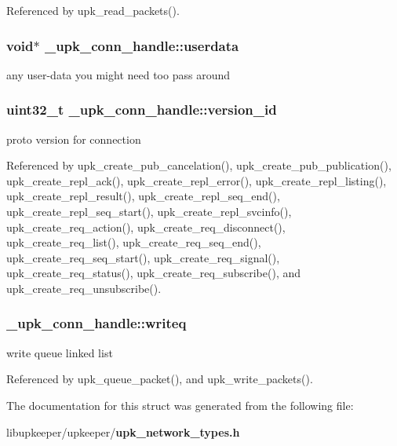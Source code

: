 Referenced by upk\_\-read\_\-packets().

\subsubsection[{userdata}]{\setlength{\rightskip}{0pt plus 5cm}void$\ast$ {\bf \_\-upk\_\-conn\_\-handle::userdata}}\label{struct__upk__conn__handle_ab2f299ba31ef81890e202d838916af22}
any user-\/data you might need too pass around 
\subsubsection[{version\_\-id}]{\setlength{\rightskip}{0pt plus 5cm}uint32\_\-t {\bf \_\-upk\_\-conn\_\-handle::version\_\-id}}\label{struct__upk__conn__handle_a8a1da5597243e08b9240cc84379d08d5}
proto version for connection 

Referenced by upk\_\-create\_\-pub\_\-cancelation(), upk\_\-create\_\-pub\_\-publication(), upk\_\-create\_\-repl\_\-ack(), upk\_\-create\_\-repl\_\-error(), upk\_\-create\_\-repl\_\-listing(), upk\_\-create\_\-repl\_\-result(), upk\_\-create\_\-repl\_\-seq\_\-end(), upk\_\-create\_\-repl\_\-seq\_\-start(), upk\_\-create\_\-repl\_\-svcinfo(), upk\_\-create\_\-req\_\-action(), upk\_\-create\_\-req\_\-disconnect(), upk\_\-create\_\-req\_\-list(), upk\_\-create\_\-req\_\-seq\_\-end(), upk\_\-create\_\-req\_\-seq\_\-start(), upk\_\-create\_\-req\_\-signal(), upk\_\-create\_\-req\_\-status(), upk\_\-create\_\-req\_\-subscribe(), and upk\_\-create\_\-req\_\-unsubscribe().

\subsubsection[{writeq}]{ {\bf \_\-upk\_\-conn\_\-handle::writeq}}\label{struct__upk__conn__handle_a68692e4f2f84769ddbaa5165f83114a7}
write queue linked list 

Referenced by upk\_\-queue\_\-packet(), and upk\_\-write\_\-packets().



The documentation for this struct was generated from the following file:\begin{DoxyCompactItemize}
\item 
libupkeeper/upkeeper/{\bf upk\_\-network\_\-types.h}\end{DoxyCompactItemize}
